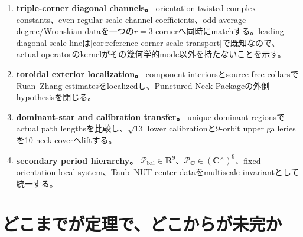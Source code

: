 \documentclass[11pt,a4paper]{ltjsarticle}
\theoremstyle{definition}
\theoremstyle{remark}
\newcommand{\CC}{\mathbf C}
\newcommand{\RR}{\mathbf R}
\begin{document}
\begin{enumerate}[label=\textbf{P\arabic*.},leftmargin=3.2em,itemsep=2mm]
\item \textbf{triple-corner diagonal channels。} orientation-twisted complex constants、even regular scale-channel coefficients、odd average-degree/Wronskian dataを一つの$r=3$ cornerへ同時にmatchする。leading diagonal scale lineは\cref{cor:reference-corner-scale-transport}で既知なので、actual operatorのkernelがその幾何学的mode以外を持たないことを示す。
\item \textbf{toroidal exterior localization。} component interiorsとsource-free collarsでRuan--Zhang estimatesをlocalizedし、Punctured Neck Packageの外側hypothesisを閉じる。
\item \textbf{dominant-star and calibration transfer。} unique-dominant regionsでactual path lengthsを比較し、$\sqrt{13}$ lower calibrationと9-orbit upper galleriesを10-neck coverへliftする。
\item \textbf{secondary period hierarchy。} $\mathcal P_{\mathrm{bal}}\in\RR^9$、$\mathcal P_{\CC}\in(\CC^\times)^9$、fixed orientation local system、Taub--NUT center dataをmultiscale invariantとして統一する。
\end{enumerate}

\section{どこまでが定理で、どこからが未完か}
\end{document}
